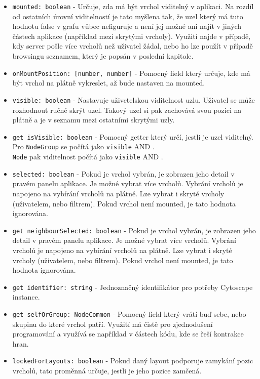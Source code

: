 \begin{itemize}
  \item \texttt{mounted: boolean} - Určuje, zda má být vrchol viditelný v aplikaci. Na rozdíl od ostatních úrovní viditelností je tato myšlena tak, že uzel který má tuto hodnotu false v grafu vůbec nefiguruje a není jej možné ani najít v jiných částech aplikace (například mezi skrytými vrcholy). Využití najde v případě, kdy server pošle více vrcholů než uživatel žádal, nebo ho lze použít v případě browsingu seznamem, který je popsán v poslední kapitole.

  \item \texttt{onMountPosition: [number, number]} - Pomocný field který určuje, kde má být vrchol na plátně vykreslet, až bude nastaven na mounted.

  \item \texttt{visible: boolean} - Nastavuje uživetelskou viditelnost uzlu. Uživatel se může rozhodnout ručně skrýt uzel. Takový uzel si pak zachovává svou pozici na plátně a je v seznamu mezi ostatními skrytými uzly.

  \item \texttt{get isVisible: boolean} - Pomocný getter který určí, jestli je uzel viditelný. \\ Pro \texttt{NodeGroup} se počítá jako \texttt{visible} AND . \\ \texttt{Node} pak viditelnost počítá jako \texttt{visible} AND .

  \item \texttt{selected: boolean} - Pokud je vrchol vybrán, je zobrazen jeho detail v pravém panelu aplikace. Je možné vybrat více vrcholů. Vybrání vrcholů je napojeno na vybírání vrcholů na plátně. Lze vybrat i skryté vrcholy (uživatelem, nebo filtrem). Pokud vrchol není mounted, je tato hodnota ignorována.

  \item \texttt{get neighbourSelected: boolean} - Pokud je vrchol vybrán, je zobrazen jeho detail v pravém panelu aplikace. Je možné vybrat více vrcholů. Vybrání vrcholů je napojeno na vybírání vrcholů na plátně. Lze vybrat i skryté vrcholy (uživatelem, nebo filtrem). Pokud vrchol není mounted, je tato hodnota ignorována.

  \item \texttt{get identifier: string} - Jednoznačný identifikátor pro potřeby Cytoscape instance.

  \item \texttt{get selfOrGroup: NodeCommon} - Pomocný field který vrátí buď sebe, nebo skupinu do které vrchol patří. Využití má čistě pro zjednodušení programování a využívá se například v částech kódu, kde se řeší kontrakce hran.

  \item \texttt{lockedForLayouts: boolean} - Pokud daný layout podporuje zamykání pozic vrcholů, tato proměnná určuje, jestli je jeho pozice zamčená.
\end{itemize}


